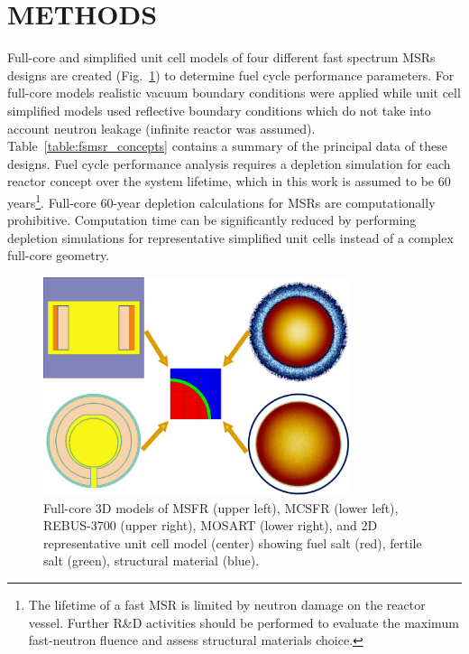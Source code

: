 \documentclass[letterpaper]{mandc2019}
\begin{document}
\section{METHODS}
\label{sec:methods}
Full-core and simplified unit cell models of four different fast spectrum \glspl{MSR} designs are created (Fig.~\ref{fig:unit_cell}) to determine fuel cycle performance parameters. For full-core models realistic vacuum boundary conditions were applied  while unit cell simplified models used reflective boundary conditions which do not take into account neutron leakage (infinite reactor was assumed). Table~\ref{table:fsmsr_concepts} contains a summary of the principal data of these designs. Fuel cycle performance analysis requires a depletion simulation for each reactor concept over the system lifetime, which in this work is assumed to be 60 years\footnote{The lifetime of a fast \gls{MSR} is limited by neutron damage on the reactor vessel. Further R\&D activities should be performed to evaluate the maximum fast-neutron fluence and assess structural materials choice.}. Full-core 60-year depletion calculations for \gls{MSR}s are computationally prohibitive. Computation time can be significantly reduced by performing depletion simulations for representative simplified unit cells instead of a complex full-core geometry.
\begin{figure}[!htb]
  \centering
  \includegraphics[width=0.8\textwidth]{./Figures/fsmsrs.pdf}
  \caption{Full-core 3D models of \gls{MSFR} (upper left), \gls{MCSFR} (lower left), REBUS-3700 (upper right), \gls{MOSART} (lower right), and 2D representative unit cell model (center) showing fuel salt (red), fertile salt (green), structural material (blue).}
  \label{fig:unit_cell}
  \vspace{-0.8in}
\end{figure}
\end{document}
